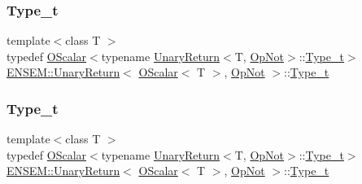 \subsubsection{\texorpdfstring{Type\_t}{Type\_t}\hspace{0.1cm}{\footnotesize\ttfamily [1/3]}}
{\footnotesize\ttfamily template$<$class T $>$ \\
typedef \mbox{\hyperlink{classENSEM_1_1OScalar}{O\+Scalar}}$<$typename \mbox{\hyperlink{structENSEM_1_1UnaryReturn}{Unary\+Return}}$<$T, \mbox{\hyperlink{structENSEM_1_1OpNot}{Op\+Not}}$>$\+::\mbox{\hyperlink{structENSEM_1_1UnaryReturn_3_01OScalar_3_01T_01_4_00_01OpNot_01_4_a0a3874d32de1d033bfe55bfd921d73be}{Type\+\_\+t}}$>$ \mbox{\hyperlink{structENSEM_1_1UnaryReturn}{E\+N\+S\+E\+M\+::\+Unary\+Return}}$<$ \mbox{\hyperlink{classENSEM_1_1OScalar}{O\+Scalar}}$<$ T $>$, \mbox{\hyperlink{structENSEM_1_1OpNot}{Op\+Not}} $>$\+::\mbox{\hyperlink{structENSEM_1_1UnaryReturn_3_01OScalar_3_01T_01_4_00_01OpNot_01_4_a0a3874d32de1d033bfe55bfd921d73be}{Type\+\_\+t}}}

\mbox{\label{structENSEM_1_1UnaryReturn_3_01OScalar_3_01T_01_4_00_01OpNot_01_4_a0a3874d32de1d033bfe55bfd921d73be}} 
\subsubsection{\texorpdfstring{Type\_t}{Type\_t}\hspace{0.1cm}{\footnotesize\ttfamily [2/3]}}
{\footnotesize\ttfamily template$<$class T $>$ \\
typedef \mbox{\hyperlink{classENSEM_1_1OScalar}{O\+Scalar}}$<$typename \mbox{\hyperlink{structENSEM_1_1UnaryReturn}{Unary\+Return}}$<$T, \mbox{\hyperlink{structENSEM_1_1OpNot}{Op\+Not}}$>$\+::\mbox{\hyperlink{structENSEM_1_1UnaryReturn_3_01OScalar_3_01T_01_4_00_01OpNot_01_4_a0a3874d32de1d033bfe55bfd921d73be}{Type\+\_\+t}}$>$ \mbox{\hyperlink{structENSEM_1_1UnaryReturn}{E\+N\+S\+E\+M\+::\+Unary\+Return}}$<$ \mbox{\hyperlink{classENSEM_1_1OScalar}{O\+Scalar}}$<$ T $>$, \mbox{\hyperlink{structENSEM_1_1OpNot}{Op\+Not}} $>$\+::\mbox{\hyperlink{structENSEM_1_1UnaryReturn_3_01OScalar_3_01T_01_4_00_01OpNot_01_4_a0a3874d32de1d033bfe55bfd921d73be}{Type\+\_\+t}}}


